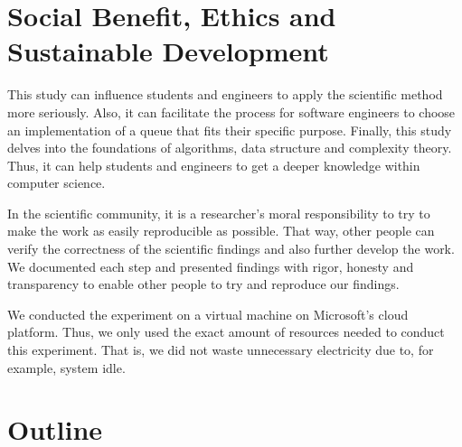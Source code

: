\documentclass[a4paper,11pt]{kth-mag}
\newcommand*{\skippara}{\par\vspace{\baselineskip} \noindent}
\begin{document}
\section{Social Benefit, Ethics and Sustainable Development}
This study can influence students and engineers to apply the scientific method more seriously.
Also, it can facilitate the process for software engineers to choose an implementation of a queue that fits their specific purpose.
Finally, this study delves into the foundations of algorithms, data structure and complexity theory.
Thus, it can help students and engineers to get a deeper knowledge within computer science.

\skippara In the scientific community, it is a researcher's moral responsibility
to try to make the work as easily reproducible as possible. That way, other
people can verify the correctness of the scientific findings and also further
develop the work. We documented each step and presented findings with rigor,
honesty and transparency to enable other people to try and reproduce our
findings.

\skippara We conducted the experiment on a virtual machine on Microsoft's cloud platform.
Thus, we only used the exact amount of resources needed to conduct this experiment.
That is, we did not waste unnecessary electricity due to, for example, system idle.




\section{Outline}






%
\end{document}
